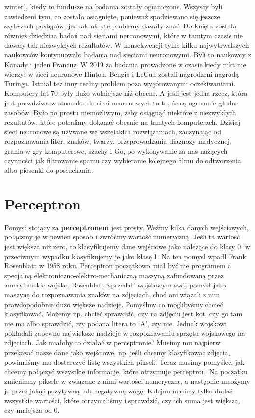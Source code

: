 winter), kiedy to fundusze na badania zostały ograniczone. Wszyscy byli zawiedzeni tym, co zostało osiągnięte, ponieważ spodziewano się jeszcze szybszych postępów, jednak ukryte problemy dawały znać. Dotknięta została również dziedzina badań nad sieciami neuronowymi, które w tamtym czasie nie dawały tak niezwykłych rezultatów. W konsekwencji tylko kilku najwytrwalszych naukowców kontynuowało badania nad sieciami neuronowymi. Byli to naukowcy z Kanady i jeden Francuz. W 2019 za badania prowadzone w czasie kiedy nikt nie wierzył w sieci neuronowe Hinton, Bengio i LeCun zostali nagrodzeni nagrodą Turinga. Istniał też inny realny problem poza wygórowanymi oczekiwaniami. Komputery lat 70 były dużo wolniejsze niż obecne. A jeśli jest jedna rzecz, która jest prawdziwa w stosunku do sieci neuronowych to to, że są ogromnie głodne zasobów. Było po prostu niemożliwym, żeby osiągnąć niektóre z niezwykłych rezultatów, które potrafimy dokonać obecnie na tamtych komputerach. Dzisiaj sieci neuronowe są używane we wszelakich rozwiązaniach, zaczynając od rozpoznawania liter, znaków, twarzy, przeprowadzania diagnozy medycznej, grania w gry komputerowe, szachy i Go, po wykonywanie za nas nużących czynności jak filtrowanie spamu czy wybieranie kolejnego filmu do odtworzenia albo piosenki do posłuchania.

\section{Perceptron}

Pomysł stojący za \textbf{perceptronem} jest prosty. Weźmy kilka danych wejściowych, połączmy je w pewien sposób i zwróćmy wartość numeryczną. Jeśli ta wartość jest większa niż zero, to klasyfikujemy dane wejściowe jako należące do klasy 0, w przeciwnym wypadku klasyfikujemy je jako klasę 1. Na ten pomysł wpadł Frank Rosenblatt w 1958 roku. Perceptron początkowo miał być nie programem a specjalną elektroniczno-elektro-mechaniczną maszyną zafundowaną przez amerykańskie wojsko. Rosenblatt ‘sprzedał’ wojskowym swój pomysł jako maszynę do rozpoznawania znaków na zdjęciach, choć oni wiązali z nim prawdopodobnie dużo większe nadzieje. Pomyślmy co moglibyśmy chcieć klasyfikować. Możemy np. chcieć sprawdzić, czy na zdjęciu jest kot, czy go tam nie ma albo sprawdzić, czy podana litera to ‘A’, czy nie. Jednak wojskowi pokładali zapewne największe nadzieje w rozpoznawaniu sprzętu wojskowego na zdjęciach. Jak miałoby to działać w perceptronie? Musimy mu najpierw przekazać nasze dane jako wejściowe, np. jeśli chcemy klasyfikować zdjęcia, powinniśmy mu dostarczyć listę wszystkich pikseli. Teraz musimy pomyśleć, jak chcemy połączyć wszystkie informacje, które otrzymuje perceptron. Na początku zmieniamy piksele w związane z nimi wartości numeryczne, a następnie mnożymy je przez jakąś pozytywną lub negatywną wagę. Kolejno musimy tylko dodać wszystkie wartości, które otrzymaliśmy i sprawdzić, czy ich suma jest większa, czy mniejsza od 0.

